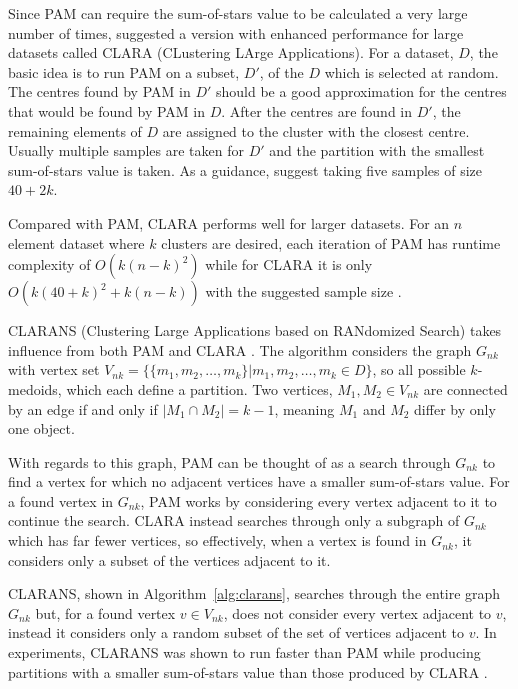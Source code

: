 \documentclass[a4paper]{report}
\newcommand{\dset}{D}
\begin{document}
Since PAM can require the sum-of-stars value to be calculated a very large
number of times, \citet{kaufman2005finding} suggested a version with enhanced
performance for large datasets called CLARA (CLustering LArge Applications).
For a dataset, $\dset$, the basic idea is to run PAM on a subset, $\dset'$, of
the $\dset$ which is selected at random.  The centres found by PAM in $\dset'$
should be a good approximation for the centres that would be found by PAM in
$\dset$.  After the centres are found in $\dset'$, the remaining elements of
$\dset$ are assigned to the cluster with the closest centre.  Usually multiple
samples are taken for $\dset'$ and the partition with the smallest
sum-of-stars value is taken.  As a guidance, \citet{kaufman2005finding}
suggest taking five samples of size $40+2k$.

Compared with PAM, CLARA performs well for larger datasets.  For an $n$
element dataset where $k$ clusters are desired, each iteration of PAM has
runtime complexity of $O(k(n-k)^2)$ while for CLARA it is only $O(k(40+k)^2 +
k(n-k))$ with the suggested sample size \citep{ng2002clarans}.

CLARANS (Clustering Large Applications based on RANdomized Search) takes
influence from both PAM and CLARA \citep{ng2002clarans}.  The algorithm
considers the graph $G_{nk}$ with vertex set $V_{nk}=\{\{m_1,m_2,\dotsc,m_k\}
| m_1,m_2,\dotsc,m_k \in \dset\}$, so all possible $k$-medoids, which each
define a partition.  Two vertices, $M_1, M_2 \in V_{nk}$ are connected by an
edge if and only if $|M_1 \cap M_2| = k-1$, meaning $M_1$ and $M_2$ differ by
only one object.

With regards to this graph, PAM can be thought of as a search through $G_{nk}$
to find a vertex for which no adjacent vertices have a smaller sum-of-stars
value.  For a found vertex in $G_{nk}$, PAM works by considering every vertex
adjacent to it to continue the search.  CLARA instead searches through only a
subgraph of $G_{nk}$ which has far fewer vertices, so effectively, when a
vertex is found in $G_{nk}$, it considers only a subset of the vertices
adjacent to it.

CLARANS, shown in Algorithm~\ref{alg:clarans}, searches through the entire
graph $G_{nk}$ but, for a found vertex $v \in V_{nk}$, does not consider every
vertex adjacent to $v$, instead it considers only a random subset of the set
of vertices adjacent to $v$.  In experiments, CLARANS was shown to run faster
than PAM while producing partitions with a smaller sum-of-stars value than
those produced by CLARA \citep{ng2002clarans}.
\end{document}
